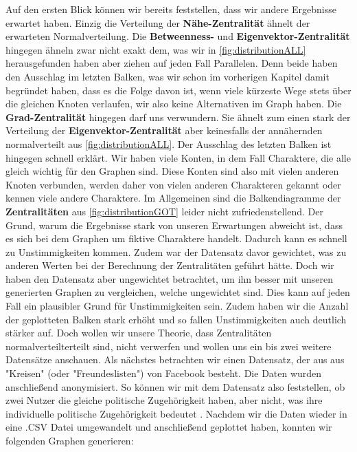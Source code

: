  Auf den ersten Blick können wir bereits feststellen, dass wir andere Ergebnisse erwartet haben. Einzig die Verteilung der \textbf{Nähe-Zentralität} ähnelt der erwarteten Normalverteilung. Die \textbf{Betweenness-} und \textbf{Eigenvektor-Zentralität} hingegen ähneln zwar nicht exakt dem, was wir in \ref{fig:distributionALL} herausgefunden haben aber ziehen auf jeden Fall Parallelen. Denn beide haben den Ausschlag im letzten Balken, was wir schon im vorherigen Kapitel damit begründet haben, dass es die Folge davon ist, wenn viele kürzeste Wege stets über die gleichen
Knoten verlaufen, wir also keine Alternativen im Graph haben. Die \textbf{Grad-Zentralität} hingegen darf uns verwundern. Sie ähnelt zum einen stark der Verteilung der \textbf{Eigenvektor-Zentralität} aber keinesfalls der annähernden normalverteilt aus \ref{fig:distributionALL}. Der Ausschlag des letzten Balken ist hingegen schnell erklärt. Wir haben viele Konten, in dem Fall Charaktere, die alle gleich wichtig für den Graphen sind. Diese Konten sind also mit vielen anderen Knoten verbunden, werden daher von vielen anderen Charakteren gekannt oder kennen viele andere Charaktere. Im Allgemeinen sind die Balkendiagramme der \textbf{Zentralitäten} aus \ref{fig:distributionGOT} leider nicht zufriedenstellend. Der Grund, warum die Ergebnisse stark von unseren Erwartungen abweicht ist, dass es sich bei dem Graphen um fiktive Charaktere handelt. Dadurch kann es schnell zu Unstimmigkeiten kommen. Zudem war der Datensatz davor gewichtet, was zu anderen Werten bei der Berechnung der Zentralitäten geführt hätte. Doch wir haben den Datensatz aber ungewichtet betrachtet, um ihn besser mit unseren generierten Graphen zu vergleichen, welche ungewichtet sind. Dies kann auf jeden Fall ein plausibler Grund für Unstimmigkeiten sein. Zudem haben wir die Anzahl der geplotteten Balken stark erhöht und so fallen Unstimmigkeiten auch deutlich stärker auf. Doch wollen wir unsere Theorie, dass Zentralitäten normalverteilterteilt sind, nicht verwerfen und wollen uns ein bis zwei weitere Datensätze anschauen. Als nächstes betrachten wir einen Datensatz, der aus aus "Kreisen" (oder "Freundeslisten") von Facebook besteht. Die Daten wurden anschließend anonymisiert. So können wir mit dem Datensatz also feststellen, ob zwei Nutzer die gleiche politische Zugehörigkeit haben, aber nicht, was ihre individuelle politische Zugehörigkeit bedeutet \cite{FBData}.
Nachdem wir die Daten wieder in eine .CSV Datei umgewandelt und anschließend geplottet haben, konnten wir folgenden Graphen generieren: 


